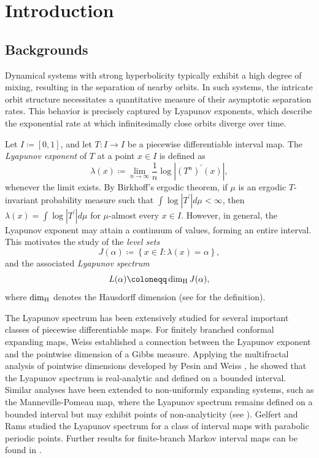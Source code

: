 \documentclass[12pt,reqno]{amsart}
\renewcommand{\=}{\coloneqq}
\theoremstyle{plain}
\begin{document}
\tableofcontents



\section{Introduction}
\subsection{Backgrounds}
Dynamical systems with strong hyperbolicity typically exhibit a high degree of mixing, resulting in the separation of nearby orbits. In such systems, the intricate orbit structure necessitates a quantitative measure of their asymptotic separation rates.
This behavior is precisely captured by Lyapunov exponents, which describe the exponential rate at which infinitesimally close orbits diverge over time.


Let $I\coloneqq[0,1]$, and let $T: I\to I$ be a piecewise differentiable interval map. The \emph{Lyapunov exponent} of $T$ at a point $x\in I$ is defined as
\begin{equation}\label{equ:Lyapunov exponent}
\lambda(x)\coloneqq\lim_{n \to \infty}\frac{1}{n}\log |(T^n)^\prime(x)|,
\end{equation}
whenever the limit exists. By Birkhoff's ergodic theorem, if $\mu$ is an ergodic $T$-invariant probability measure such that $\int \log|T^\prime|d\mu <\infty$, then $\lambda(x) = \int \log|T^\prime|d\mu$ for $\mu$-almost every $x\in I$. However, in general, the Lyapunov exponent may attain a continuum of values, forming an entire interval. This motivates the study of the \emph{level sets}
\begin{equation}\label{equ_levelset}
J(\alpha)\coloneqq \left\{x\in I: \lambda(x)=\alpha\right\},
\end{equation}
and the associated \emph{Lyapunov spectrum}
\begin{equation}\label{equ_Lyapunovspectrum}
L(\alpha)\coloneqq \dim_{\rm H}J(\alpha),
\end{equation}
where $\dim_{\rm H}$ denotes the Hausdorff dimension (see \cite{Fal} for the definition).


The Lyapunov spectrum has been extensively studied for several important classes of piecewise differentiable maps.
For finitely branched conformal expanding maps, Weiss \cite{Wei} established a connection between the Lyapunov exponent and the pointwise dimension of a Gibbs measure. Applying the multifractal analysis of pointwise dimensions developed by Pesin and Weiss \cite{PW97}, he showed that the Lyapunov spectrum is real-analytic and defined on a bounded interval. Similar analyses have been extended to non-uniformly expanding systems, such as the Manneville-Pomeau map, where the Lyapunov spectrum remains defined on a bounded interval but may exhibit points of non-analyticity (see \cite{PW}). Gelfert and Rams \cite{GR} studied the Lyapunov spectrum for a class of interval maps with parabolic periodic points.
Further results for finite-branch Markov interval maps can be found in \cite{BS, FLW, JJOP, Nak, PS, TV03}.
\end{document}
